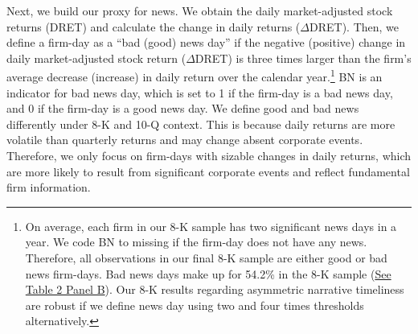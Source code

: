 \documentclass[letterpaper,12pt]{article}
\begin{document}
\begin{spacing}{1.5}
Next, we build our proxy for news. We obtain the daily market-adjusted stock returns (DRET) and calculate the change in daily returns ($\Delta$DRET). Then, we define a firm-day as a ``bad (good) news day” if the negative (positive) change in daily market-adjusted stock return ($\Delta$DRET) is three times larger than the firm's average decrease (increase) in daily return over the calendar year.\footnote{On average, each firm in our 8-K sample has two significant news days in a year. We code BN to missing if the firm-day does not have any news. Therefore, all observations in our final 8-K sample are either good or bad news firm-days. Bad news days make up for 54.2\% in the 8-K sample (\hyperref[T2PB]{See Table 2 Panel B}). Our 8-K results regarding asymmetric narrative timeliness are robust if we define news day using two and four times thresholds alternatively.} BN is an indicator for bad news day, which is set to 1 if the firm-day is a bad news day, and 0 if the firm-day is a good news day. We define good and bad news differently under 8-K and 10-Q context. This is because daily returns are more volatile than quarterly returns and may change absent corporate events. Therefore, we only focus on firm-days with sizable changes in daily returns, which are more likely to result from significant corporate events and reflect fundamental firm information.


\end{spacing}
\end{document}
